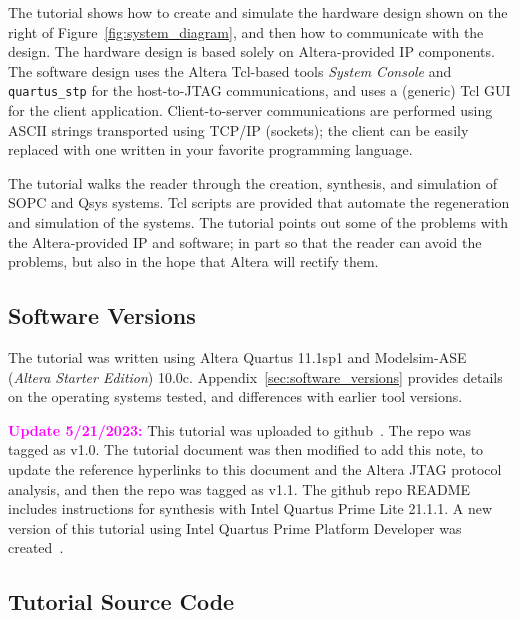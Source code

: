 \documentclass[10pt,twoside]{article}
\begin{document}
The tutorial shows how to create and simulate the hardware
design shown on the right of Figure~\ref{fig:system_diagram},
and then how to communicate with the design. The hardware design 
is based solely on Altera-provided IP components. The software
design uses the Altera Tcl-based tools {\em System Console} and
\verb+quartus_stp+ for the host-to-JTAG communications, and uses 
a (generic) Tcl GUI for the client application. Client-to-server
communications are performed using ASCII strings transported using
TCP/IP (sockets); the client can be easily replaced with one 
written in your favorite programming language.

The tutorial walks the reader through the creation, synthesis,
and simulation of SOPC and Qsys systems. Tcl scripts are provided
that automate the regeneration and simulation of the systems.
The tutorial points out some of the problems with the Altera-provided
IP and software; in part so that the reader can avoid the
problems, but also in the hope that Altera will rectify them.

\subsection*{Software Versions}

The tutorial was written using Altera Quartus 11.1sp1 and 
Modelsim-ASE ({\em Altera Starter Edition}) 10.0c. 
Appendix~\ref{sec:software_versions} provides details on
the operating systems tested, and differences with
earlier tool versions.

\textcolor{magenta}{\textbf{Update 5/21/2023:}} This tutorial
was uploaded to github~\cite{Hawkins_Altera_JTAG_to_Avalon_MM_Tutorial_2012}.
The repo was tagged as v1.0. The tutorial document was then
modified to add this note, to update the reference hyperlinks to
this document and the Altera JTAG protocol analysis, and then
the repo was tagged as v1.1. The github repo README 
includes instructions for synthesis with Intel Quartus Prime Lite 21.1.1. 
A new version of this tutorial using Intel Quartus Prime Platform 
Developer was created~\cite{Hawkins_Intel_JTAG_to_Avalon_MM_Tutorial_2023}.

\clearpage
\subsection*{Tutorial Source Code}
\end{document}
